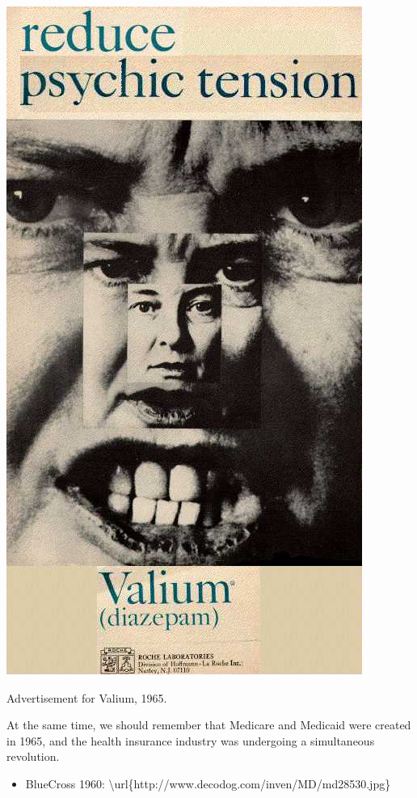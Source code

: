 \begin{refsection}
\begin{itemize}
\begin{marginfigure}
\begin{center}
 \includegraphics{../images/valium65.jpg}
\end{center}
 \caption{Advertisement for Valium, 1965.  }
\label{fig: valium65}
\end{marginfigure}


\end{itemize}

At the same time, we should remember that Medicare and Medicaid were created in 1965, and the health insurance industry was undergoing a simultaneous revolution. 

\begin{itemize}
\item BlueCross 1960: \textbackslash{}url\{http:\slash \slash www.decodog.com\slash inven\slash MD\slash md28530.jpg\}


\end{itemize}
\end{refsection}
